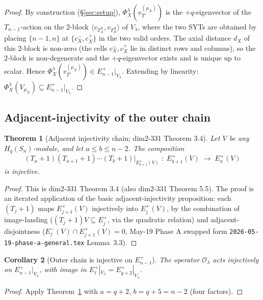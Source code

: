 \documentclass[11pt]{article}
\newtheorem{theorem}{Theorem}
\newtheorem{corollary}[theorem]{Corollary}
\theoremstyle{definition}
\begin{document}
\begin{proof}
By construction (\S\ref{sec:setup}),
$\Phi_X^\lambda(v_{T'}^{(\mu_X)})$ is the $+q$-eigenvector of the
$T_{n-1}$-action on the $2$-block $\langle v_{T_A^X}, v_{T_B^X}\rangle$
of $V_\lambda$, where the two SYTs are obtained by placing $\{n-1, n\}$
at $\{c_X^-, c_X^+\}$ in the two valid orders. The axial distance
$d_X$ of this $2$-block is non-zero (the cells $c_X^-, c_X^+$ lie in
distinct rows and columns), so the $2$-block is non-degenerate and the
$+q$-eigenvector exists and is unique up to scalar. Hence
$\Phi_X^\lambda(v_{T'}^{(\mu_X)}) \in E_{n-1}^+|_{V_\lambda}$. Extending
by linearity: $\Phi_X^\lambda(V_{\mu_X}) \subseteq E_{n-1}^+|_{V_\lambda}$.
\end{proof}

\subsection{Adjacent-injectivity of the outer chain}

\begin{theorem}[Adjacent injectivity chain; dim2-331 Theorem 3.4]
\label{thm:adj-inj}
Let $V$ be any $H_q(S_n)$-module, and let
$a \le b \le n - 2$. The composition
\[
   (T_a{+}1)(T_{a+1}{+}1)\cdots(T_b{+}1)\big|_{E_{b+1}^+(V)}
   \;:\;
   E_{b+1}^+(V) \;\to\; E_a^+(V)
\]
is injective.
\end{theorem}

\begin{proof}
This is dim2-331 Theorem 3.4 (also dim2-331 Theorem 5.5). The proof is
an iterated application of the basic adjacent-injectivity proposition:
each $(T_j+1)$ maps $E_{j+1}^+(V)$ injectively into $E_j^+(V)$, by the
combination of image-landing ($(T_j+1)V \subseteq E_j^+$, via the
quadratic relation) and adjacent-disjointness
($E_j^-(V) \cap E_{j+1}^+(V) = 0$, May-19 Phase A swapped form
\texttt{2026-05-19-phase-a-general.tex} Lemma~3.3).
\end{proof}

\begin{corollary}[Outer chain is injective on $E_{n-1}^+$]\label{cor:O-inj}
The operator $\mathcal{O}_\lambda$ acts injectively on
$E_{n-1}^+|_{V_\lambda}$, with image in
$E_\ell^+|_{V_\lambda} = E_{q+2}^+|_{V_\lambda}$.
\end{corollary}

\begin{proof}
Apply Theorem~\ref{thm:adj-inj} with $a = q+2$, $b = q+5 = n-2$
(four factors).
\end{proof}
\end{document}
